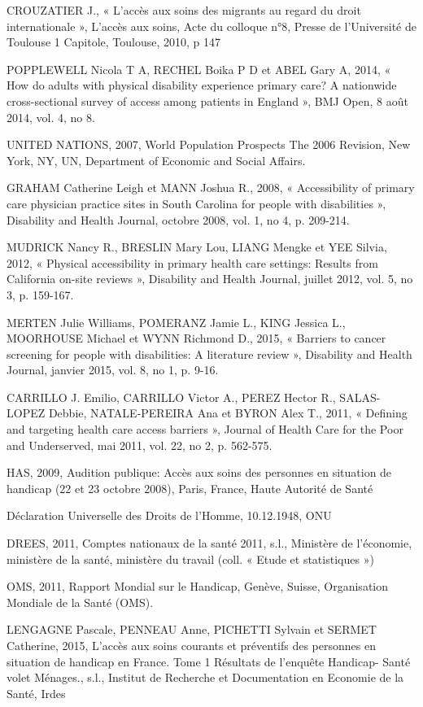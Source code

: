 CROUZATIER J., « L’accès aux soins des migrants au regard du droit internationale », L’accès aux soins, Acte du colloque n°8, Presse de l’Université de Toulouse 1 Capitole, Toulouse, 2010, p 147


POPPLEWELL Nicola T A, RECHEL Boika P D et ABEL Gary A, 2014, « How do adults with physical disability experience primary care? A nationwide cross-sectional survey of access among patients in England », BMJ Open, 8 août 2014, vol. 4, no 8.

UNITED NATIONS, 2007, World Population Prospects The 2006 Revision, New York, NY, UN, Department
of Economic and Social Affairs.

GRAHAM Catherine Leigh et MANN Joshua R., 2008, « Accessibility of primary care physician practice sites in South Carolina for people with disabilities », Disability and Health Journal, octobre 2008, vol. 1, no 4, p. 209-214.

MUDRICK Nancy R., BRESLIN Mary Lou, LIANG Mengke et YEE Silvia, 2012, « Physical accessibility in primary health care settings: Results from California on-site reviews », Disability and Health Journal, juillet 2012, vol. 5, no 3, p. 159-167.

MERTEN Julie Williams, POMERANZ Jamie L., KING Jessica L., MOORHOUSE Michael et WYNN Richmond D., 2015, « Barriers to cancer screening for people with disabilities: A literature review », Disability and Health Journal, janvier 2015, vol. 8, no 1, p. 9-16.

CARRILLO J. Emilio, CARRILLO Victor A., PEREZ Hector R., SALAS-LOPEZ Debbie, NATALE-PEREIRA Ana et BYRON Alex T., 2011, « Defining and targeting health care access barriers », Journal of Health Care for the Poor and Underserved, mai 2011, vol. 22, no 2, p. 562-575.

HAS, 2009, Audition publique: Accès aux soins des personnes en situation de handicap (22 et 23 octobre 2008), Paris, France, Haute Autorité de Santé

Déclaration Universelle des Droits de l'Homme, 10.12.1948, ONU

DREES, 2011, Comptes nationaux de la santé 2011, s.l., Ministère de l’économie, ministère de la santé, ministère du travail (coll. « Etude et statistiques »)

OMS, 2011, Rapport Mondial sur le Handicap, Genève, Suisse, Organisation Mondiale de la Santé (OMS).

LENGAGNE Pascale, PENNEAU Anne, PICHETTI Sylvain et SERMET Catherine, 2015, L’accès aux soins courants et préventifs des personnes en situation de handicap en France. Tome 1 Résultats de l’enquête Handicap- Santé volet Ménages., s.l., Institut de Recherche et Documentation en Economie de la Santé, Irdes

